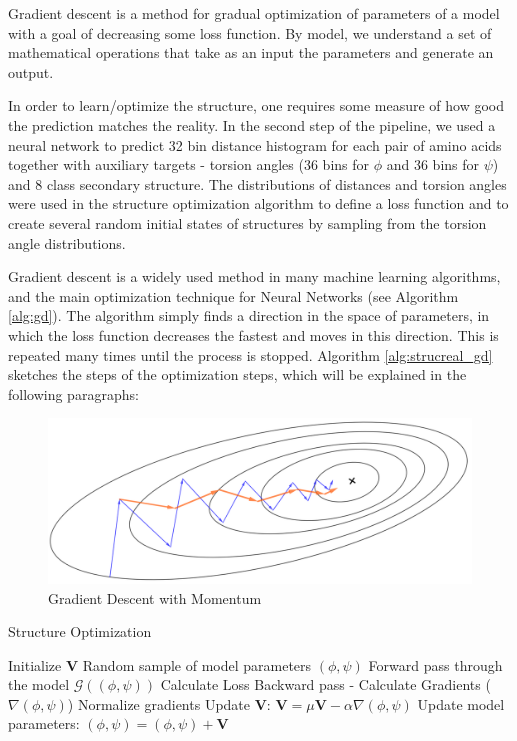 Gradient descent is a method for gradual optimization of parameters of a model with a goal of decreasing some loss function. By model, we understand a set of mathematical operations that take as an input the parameters and generate an output. 

In order to learn/optimize the structure, one requires some measure of how good the prediction matches the reality. In the second step of the pipeline, we used a neural network to predict 32 bin distance histogram for each pair of amino acids together with auxiliary targets - torsion angles (36 bins for $\phi$ and 36 bins for $\psi$) and 8 class secondary structure. The distributions of distances and torsion angles were used in the structure optimization algorithm to define a loss function and to create several random initial states of structures by sampling from the torsion angle distributions.

Gradient descent is a widely used method in many machine learning algorithms, and the main optimization technique for Neural Networks (see Algorithm \ref{alg:gd}). The algorithm simply finds a direction in the space of parameters, in which the loss function decreases the fastest and moves in this direction. This is repeated many times until the process is stopped. Algorithm \ref{alg:strucreal_gd} sketches the steps of the optimization steps, which will be explained in the following paragraphs:

\begin{figure}
    \centering
    \includegraphics[width=\linewidth]{imgs_tomas/momentum.png}
    \caption{Gradient Descent with Momentum}
    \label{fig:momentum}
\end{figure}

\begin{algorithm}[ht]
\caption{Structure Optimization}
\label{alg:strucreal_gd}
\begin{algorithmic}[1]
\State Initialize $\bm{V}$
\State Random sample of model parameters $(\phi, \psi)$
    \Repeat
        \State Forward pass through the model $\mathcal{G}((\phi, \psi))$
        \State Calculate Loss
        \State Backward pass - Calculate Gradients ($\nabla (\phi, \psi)$)
        \State Normalize gradients
        \State Update $\bm{V}$: $\bm{V} = \mu \bm{V} - \alpha \nabla (\phi, \psi)$
        \State Update model parameters: $(\phi, \psi) = (\phi, \psi) + \bm{V}$
\end{algorithmic}
\end{algorithm}

